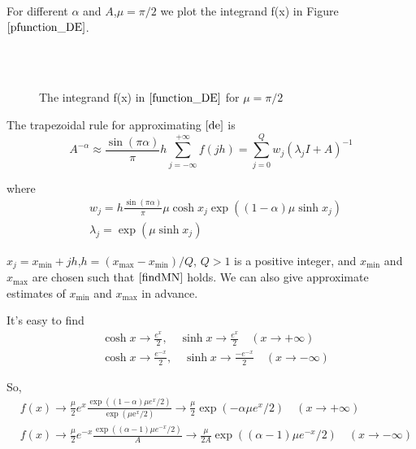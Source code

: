  For different $\alpha$ and $A$,$\mu=\pi/2$ we plot the integrand f(x) in Figure $\ref{pfunction_DE}$.
 \begin{figure}[htbp]
\centering
{}
~~
~~
\\
~~
~~
  \caption{The integrand f(x) in $\eqref{function_DE}$ for $\mu=\pi/2$}
  \label{pfunction_DE}
\end{figure}


The trapezoidal rule for approximating $\eqref{de} $ is
\begin{equation}
{A}^{-\alpha}\approx \frac{\sin(\pi \alpha)}{\pi} h\sum_{j=-\infty}^{+\infty} f(jh)=\sum_{j=0}^{Q}w_j(\lambda_jI+A)^{-1}\label{DE}
\end{equation}

where
\begin{equation}
\begin{aligned}
&w_j=h\frac{\sin(\pi \alpha)}{\pi}\mu\cosh x_j\exp((1-\alpha)\mu\sinh x_j )\\
&\lambda_j=\exp(\mu\sinh x_j)
\end{aligned}
\end{equation}

$x_j=x_{\min}+jh$,$h=(x_{\max}-x_{\min})/Q$, $Q>1$ is a positive integer, and $x_{\min}$ and $x_{\max}$ are chosen such that $\eqref{findMN}$ holds. We can also give approximate estimates of $x_{\min}$ and $x_{\max}$ in advance.

It's easy to find
\begin{equation}
\begin{aligned}
&\cosh x\rightarrow \frac{e^x}{2},\quad \sinh x \rightarrow \frac{e^x}{2} \quad(x\rightarrow +\infty)\\
&\cosh x\rightarrow \frac{e^{-x}}{2},\quad \sinh x \rightarrow \frac{-e^{-x}}{2} \quad (x \rightarrow -\infty)
\end{aligned}
\end{equation}

So,
\begin{equation}
\begin{aligned}
& f\left( x \right) \rightarrow
	\frac{\mu}{2}e^x\frac{\exp \left( \left( 1-\alpha \right) \mu e^x/2 \right)}{\exp \left( \mu \text{e}^x/2 \right)}
	\rightarrow \frac{\mu}{2}\exp \left(  -\alpha \mu e^x /2\right)
	\quad (x \rightarrow +\infty)\\
& f\left( x \right) \rightarrow 	 \frac{\mu}{2} e^{-x} \frac{\exp \left((\alpha-1)\mu e^{-x}/2\right)}{A} \rightarrow
	 \frac{\mu}{2 A}  \exp \left((\alpha-1)\mu e^{-x}/2\right)
	 \quad (x \rightarrow -\infty)\\
\end{aligned}
\label{AS_DE}
\end{equation}

